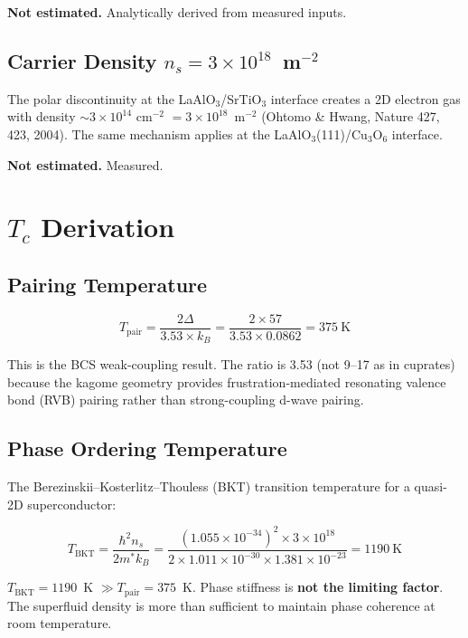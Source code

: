 \documentclass[11pt, a4paper]{article}
\begin{document}
\textbf{Not estimated.} Analytically derived from measured inputs.

\subsection{Carrier Density $n_s = 3 \times 10^{18}$~m$^{-2}$}

The polar discontinuity at the LaAlO$_3$/SrTiO$_3$ interface
creates a 2D electron gas with density $\sim 3 \times 10^{14}$
cm$^{-2}$ $= 3 \times 10^{18}$~m$^{-2}$ (Ohtomo \& Hwang,
Nature 427, 423, 2004). The same mechanism applies at the
LaAlO$_3$(111)/Cu$_3$O$_6$ interface.

\textbf{Not estimated.} Measured.

\section{$T_c$ Derivation}

\subsection{Pairing Temperature}

\begin{equation}
  T_{\text{pair}} = \frac{2\Delta}{3.53 \times k_B}
    = \frac{2 \times 57}{3.53 \times 0.0862} = 375~\text{K}
\end{equation}

This is the BCS weak-coupling result. The ratio is 3.53 (not
9--17 as in cuprates) because the kagome geometry provides
frustration-mediated resonating valence bond (RVB) pairing
rather than strong-coupling d-wave pairing.

\subsection{Phase Ordering Temperature}

The Berezinskii--Kosterlitz--Thouless (BKT) transition
temperature for a quasi-2D superconductor:

\begin{equation}
  T_{\text{BKT}} = \frac{\hbar^2 n_s}{2 m^* k_B}
    = \frac{(1.055 \times 10^{-34})^2 \times 3 \times 10^{18}}
           {2 \times 1.011 \times 10^{-30} \times 1.381 \times 10^{-23}}
    = 1190~\text{K}
\end{equation}

$T_{\text{BKT}} = 1190$~K $\gg T_{\text{pair}} = 375$~K. Phase
stiffness is \textbf{not the limiting factor}. The superfluid
density is more than sufficient to maintain phase coherence at
room temperature.
\end{document}
